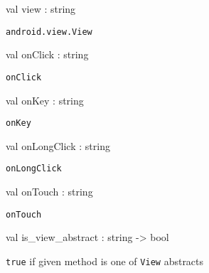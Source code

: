 \documentclass[11pt]{article}
\begin{document}
\begin{ocamldocsigend}
\label{val:Android.View.view}\begin{ocamldoccode}
val view : string
\end{ocamldoccode}
\begin{ocamldocdescription}
{\tt{android.view.View}}


\end{ocamldocdescription}


\label{val:Android.View.onClick}\begin{ocamldoccode}
val onClick : string
\end{ocamldoccode}
\begin{ocamldocdescription}
{\tt{onClick}}


\end{ocamldocdescription}


\label{val:Android.View.onKey}\begin{ocamldoccode}
val onKey : string
\end{ocamldoccode}
\begin{ocamldocdescription}
{\tt{onKey}}


\end{ocamldocdescription}


\label{val:Android.View.onLongClick}\begin{ocamldoccode}
val onLongClick : string
\end{ocamldoccode}
\begin{ocamldocdescription}
{\tt{onLongClick}}


\end{ocamldocdescription}


\label{val:Android.View.onTouch}\begin{ocamldoccode}
val onTouch : string
\end{ocamldoccode}
\begin{ocamldocdescription}
{\tt{onTouch}}


\end{ocamldocdescription}


\label{val:Android.View.is-underscoreview-underscoreabstract}\begin{ocamldoccode}
val is_view_abstract : string -> bool
\end{ocamldoccode}
\begin{ocamldocdescription}
{\tt{true}} if given method is one of {\tt{View}} abstracts


\end{ocamldocdescription}
\end{ocamldocsigend}
\end{document}

